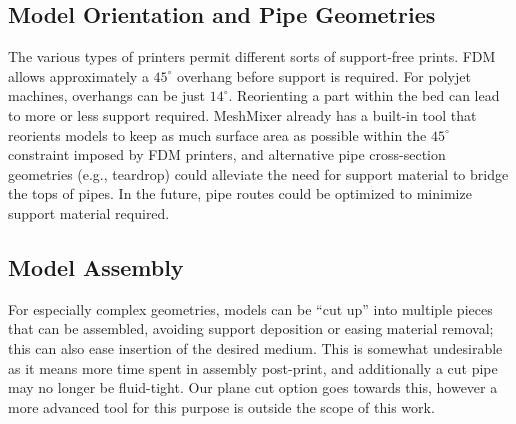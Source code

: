 {\subsection{Model Orientation and Pipe Geometries}
The various types of printers permit different sorts of support-free prints.  FDM allows approximately a $45^\circ$ overhang before support is required.  For polyjet machines, overhangs can be just $14^\circ$.  Reorienting a part within the bed can lead to more or less support required.  MeshMixer already has a built-in tool that reorients models to keep as much surface area as possible within the $45^\circ$ constraint imposed by FDM printers, and alternative pipe cross-section geometries (e.g., teardrop) could alleviate the need for support material to bridge the tops of pipes.  In the future, pipe routes could be optimized to minimize support material required.

\subsection{Model Assembly}
For especially complex geometries, models can be ``cut up'' into multiple pieces that can be assembled, avoiding support deposition or easing material removal; this can also ease insertion of the desired medium. This is somewhat undesirable as it means more time spent in assembly post-print, and additionally a cut pipe may no longer be fluid-tight.  Our plane cut option goes towards this, however a more advanced tool for this purpose is outside the scope of this work.
}